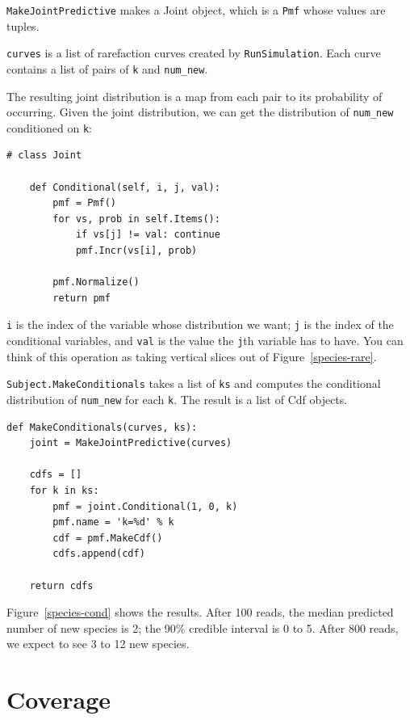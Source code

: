 \documentclass[12pt]{book}
\begin{document}
{\tt MakeJointPredictive} makes a Joint object, which is a
{\tt Pmf} whose values are tuples.

{\tt curves} is a list of rarefaction curves created by
{\tt RunSimulation}.  Each curve contains a list of pairs of
{\tt k} and \verb"num_new".

The resulting joint distribution is a map from each pair to
its probability of occurring.  Given the joint distribution, we
can get the distribution of \verb"num_new" conditioned on {\tt k}:

\begin{verbatim}
# class Joint

    def Conditional(self, i, j, val):
        pmf = Pmf()
        for vs, prob in self.Items():
            if vs[j] != val: continue
            pmf.Incr(vs[i], prob)

        pmf.Normalize()
        return pmf
\end{verbatim}

{\tt i} is the index of the variable whose distribution we want;
{\tt j} is the index of the conditional variables, and {\tt val}
is the value the {\tt j}th variable has to have.
You can think of this operation as taking vertical slices out
of Figure~\ref{species-rare}.

{\tt Subject.MakeConditionals} takes a list of {\tt ks}
and computes the conditional distribution of \verb"num_new"
for each {\tt k}.  The result is a list of Cdf objects.

\begin{verbatim}
def MakeConditionals(curves, ks):
    joint = MakeJointPredictive(curves)

    cdfs = []
    for k in ks:
        pmf = joint.Conditional(1, 0, k)
        pmf.name = 'k=%d' % k
        cdf = pmf.MakeCdf()
        cdfs.append(cdf)

    return cdfs
\end{verbatim}

Figure~\ref{species-cond} shows the results.  After 100 reads, the
median predicted number of new species is 2; the 90\% credible
interval is 0 to 5.  After 800 reads, we expect to see 3 to 12 new
species.


\section{Coverage}
\end{document}
